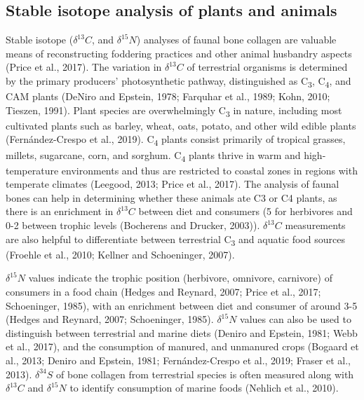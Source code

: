 \documentclass[review]{elsarticle} %
\begin{document}
\hypertarget{stable-isotope-analysis-of-plants-and-animals}{%
\subsection{Stable isotope analysis of plants and animals}\label{stable-isotope-analysis-of-plants-and-animals}}

Stable isotope (\(\delta ^{13}C\), and \(\delta ^{15}N\)) analyses of faunal bone collagen are valuable means of reconstructing foddering practices and other animal husbandry aspects (Price et al., 2017). The variation in \(\delta ^{13}C\) of terrestrial organisms is determined by the primary producers' photosynthetic pathway, distinguished as C\textsubscript{3}, C\textsubscript{4}, and CAM plants (DeNiro and Epstein, 1978; Farquhar et al., 1989; Kohn, 2010; Tieszen, 1991). Plant species are overwhelmingly C\textsubscript{3} in nature, including most cultivated plants such as barley, wheat, oats, potato, and other wild edible plants (Fernández-Crespo et al., 2019). C\textsubscript{4} plants consist primarily of tropical grasses, millets, sugarcane, corn, and sorghum. C\textsubscript{4} plants thrive in warm and high-temperature environments and thus are restricted to coastal zones in regions with temperate climates (Leegood, 2013; Price et al., 2017). The analysis of faunal bones can help in determining whether these animals ate C3 or C4 plants, as there is an enrichment in \(\delta ^{13}C\) between diet and consumers (5\text{\textperthousand} for herbivores and 0-2\text{\textperthousand} between trophic levels (Bocherens and Drucker, 2003)). \(\delta ^{13}C\) measurements are also helpful to differentiate between terrestrial C\textsubscript{3} and aquatic food sources (Froehle et al., 2010; Kellner and Schoeninger, 2007).

\(\delta ^{15}N\) values indicate the trophic position (herbivore, omnivore, carnivore) of consumers in a food chain (Hedges and Reynard, 2007; Price et al., 2017; Schoeninger, 1985), with an enrichment between diet and consumer of around 3-5\text{\textperthousand} (Hedges and Reynard, 2007; Schoeninger, 1985). \(\delta ^{15}N\) values can also be used to distinguish between terrestrial and marine diets (Deniro and Epstein, 1981; Webb et al., 2017), and the consumption of manured, and unmanured crops (Bogaard et al., 2013; Deniro and Epstein, 1981; Fernández-Crespo et al., 2019; Fraser et al., 2013). \(\delta ^{34}S\) of bone collagen from terrestrial species is often measured along with \(\delta ^{13}C\) and \(\delta ^{15}N\) to identify consumption of marine foods (Nehlich et al., 2010).
\end{document}
